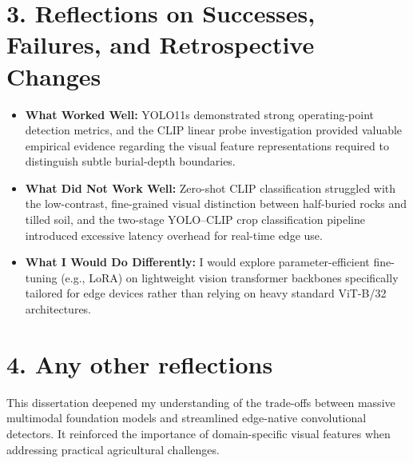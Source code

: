 \documentclass[11pt, a4paper]{article}
\begin{document}
\section*{3. Reflections on Successes, Failures, and Retrospective Changes}
\begin{itemize}
    \item \textbf{What Worked Well:} YOLO11s demonstrated strong operating-point detection metrics, and the CLIP linear probe investigation provided valuable empirical evidence regarding the visual feature representations required to distinguish subtle burial-depth boundaries.
    \item \textbf{What Did Not Work Well:} Zero-shot CLIP classification struggled with the low-contrast, fine-grained visual distinction between half-buried rocks and tilled soil, and the two-stage YOLO--CLIP crop classification pipeline introduced excessive latency overhead for real-time edge use.
    \item \textbf{What I Would Do Differently:} I would explore parameter-efficient fine-tuning (e.g., LoRA) on lightweight vision transformer backbones specifically tailored for edge devices rather than relying on heavy standard ViT-B/32 architectures.
\end{itemize}

\section*{4. Any other reflections}
This dissertation deepened my understanding of the trade-offs between massive multimodal foundation models and streamlined edge-native convolutional detectors. It reinforced the importance of domain-specific visual features when addressing practical agricultural challenges.
\end{document}
